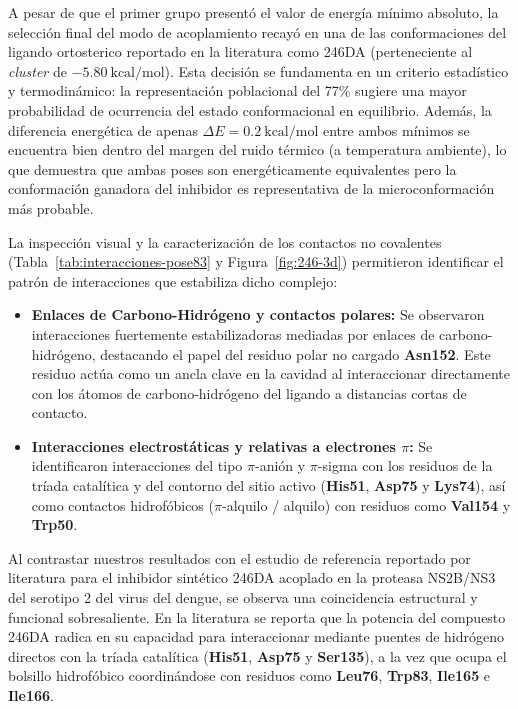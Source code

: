 A pesar de que el primer grupo presentó el valor de energía mínimo absoluto, la selección final del modo de acoplamiento recayó en una de las conformaciones del ligando ortosterico reportado en la literatura como 246DA (perteneciente al \textit{cluster} de $-5.80\ \text{kcal/mol}$). Esta decisión se fundamenta en un criterio estadístico y termodinámico: la representación poblacional del 77\% sugiere una mayor probabilidad de ocurrencia del estado conformacional en equilibrio. Además, la diferencia energética de apenas $\Delta E = 0.2\ \text{kcal/mol}$ entre ambos mínimos se encuentra bien dentro del margen del ruido térmico (a temperatura ambiente), lo que demuestra que ambas poses son energéticamente equivalentes pero la conformación ganadora del inhibidor  es representativa de la microconformación más probable.

La inspección visual y la caracterización de los contactos no covalentes  (Tabla~\ref{tab:interacciones-pose83} y Figura~\ref{fig:246-3d}) permitieron identificar el patrón de interacciones que estabiliza dicho complejo:

\begin{itemize}
    \item \textbf{Enlaces de Carbono-Hidrógeno y contactos polares:} Se observaron interacciones fuertemente estabilizadoras mediadas por enlaces de carbono-hidrógeno, destacando el papel del residuo polar no cargado \textbf{Asn152}. Este residuo actúa como un ancla clave en la cavidad al interaccionar directamente con los átomos de carbono-hidrógeno del ligando a distancias cortas de contacto.
    \item \textbf{Interacciones electrostáticas y relativas a electrones $\pi$:} Se identificaron interacciones del tipo $\pi$-anión y $\pi$-sigma con los residuos de la tríada catalítica y del contorno del sitio activo (\textbf{His51}, \textbf{Asp75} y \textbf{Lys74}), así como contactos hidrofóbicos ($\pi$-alquilo / alquilo) con residuos como \textbf{Val154} y \textbf{Trp50}.
\end{itemize}

Al contrastar nuestros resultados con el estudio de referencia reportado por literatura para el inhibidor sintético 246DA  acoplado en la proteasa NS2B/NS3 del serotipo 2 del virus del dengue, se observa una coincidencia estructural y funcional sobresaliente. En la literatura se reporta que la potencia del compuesto 246DA radica en su capacidad para interaccionar mediante puentes de hidrógeno directos con la tríada catalítica (\textbf{His51}, \textbf{Asp75} y \textbf{Ser135}), a la vez que ocupa el bolsillo hidrofóbico coordinándose con residuos como \textbf{Leu76}, \textbf{Trp83}, \textbf{Ile165} e \textbf{Ile166}. 


